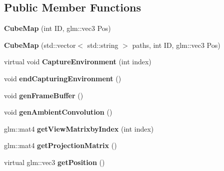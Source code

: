\subsection*{Public Member Functions}
\begin{DoxyCompactItemize}
\item 
{\bfseries Cube\+Map} (int ID, glm\+::vec3 Pos)\hypertarget{class_cube_map_a83b70c2d6512569a18a2635c80ce016f}{}\label{class_cube_map_a83b70c2d6512569a18a2635c80ce016f}

\item 
{\bfseries Cube\+Map} (std\+::vector$<$ std\+::string $>$ paths, int ID, glm\+::vec3 Pos)\hypertarget{class_cube_map_a378d9efce6a735333fa729b41139311c}{}\label{class_cube_map_a378d9efce6a735333fa729b41139311c}

\item 
virtual void {\bfseries Capture\+Environment} (int index)\hypertarget{class_cube_map_a0a61a5ed08518ba002f23fbc5d8e9d05}{}\label{class_cube_map_a0a61a5ed08518ba002f23fbc5d8e9d05}

\item 
void {\bfseries end\+Capturing\+Environment} ()\hypertarget{class_cube_map_a61c5c70fffa991f6ed4f89a0dbb22e0a}{}\label{class_cube_map_a61c5c70fffa991f6ed4f89a0dbb22e0a}

\item 
void {\bfseries gen\+Frame\+Buffer} ()\hypertarget{class_cube_map_a37dd1b5096863f271a82a73774890d7c}{}\label{class_cube_map_a37dd1b5096863f271a82a73774890d7c}

\item 
void {\bfseries gen\+Ambient\+Convolution} ()\hypertarget{class_cube_map_a0797ebc5b6ba76861e75f0430fc1e905}{}\label{class_cube_map_a0797ebc5b6ba76861e75f0430fc1e905}

\item 
glm\+::mat4 {\bfseries get\+View\+Matrixby\+Index} (int index)\hypertarget{class_cube_map_a1f30c27f1f2d8498e4ac7a56f35d458e}{}\label{class_cube_map_a1f30c27f1f2d8498e4ac7a56f35d458e}

\item 
glm\+::mat4 {\bfseries get\+Projection\+Matrix} ()\hypertarget{class_cube_map_ac48b4b3164ffe920b8e9b0399c11f540}{}\label{class_cube_map_ac48b4b3164ffe920b8e9b0399c11f540}

\item 
virtual glm\+::vec3 {\bfseries get\+Position} ()\hypertarget{class_cube_map_a1fd3790fa6d80720250fc0359e692a2e}{}\label{class_cube_map_a1fd3790fa6d80720250fc0359e692a2e}


\end{DoxyCompactItemize}
